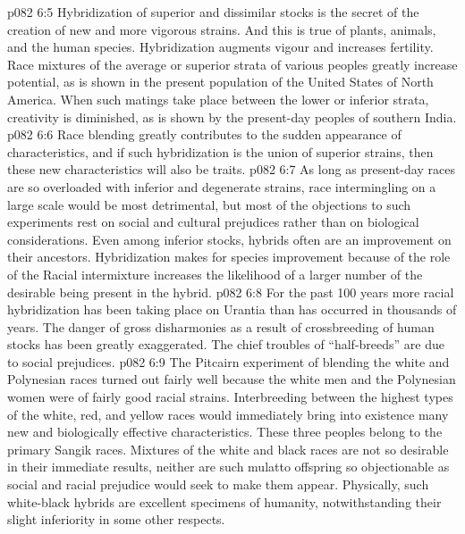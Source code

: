 \vs p082 6:5 Hybridization of superior and dissimilar stocks is the secret of the creation of new and more vigorous strains. And this is true of plants, animals, and the human species. Hybridization augments vigour and increases fertility. Race mixtures of the average or superior strata of various peoples greatly increase  potential, as is shown in the present population of the United States of North America. When such matings take place between the lower or inferior strata, creativity is diminished, as is shown by the present\hyp{}day peoples of southern India.
\vs p082 6:6 Race blending greatly contributes to the sudden appearance of  characteristics, and if such hybridization is the union of superior strains, then these new characteristics will also be  traits.
\vs p082 6:7 As long as present\hyp{}day races are so overloaded with inferior and degenerate strains, race intermingling on a large scale would be most detrimental, but most of the objections to such experiments rest on social and cultural prejudices rather than on biological considerations. Even among inferior stocks, hybrids often are an improvement on their ancestors. Hybridization makes for species improvement because of the role of the  Racial intermixture increases the likelihood of a larger number of the desirable  being present in the hybrid.
\vs p082 6:8 \pc For the past 100 years more racial hybridization has been taking place on Urantia than has occurred in thousands of years. The danger of gross disharmonies as a result of crossbreeding of human stocks has been greatly exaggerated. The chief troubles of “half\hyp{}breeds” are due to social prejudices.
\vs p082 6:9 The Pitcairn experiment of blending the white and Polynesian races turned out fairly well because the white men and the Polynesian women were of fairly good racial strains. Interbreeding between the highest types of the white, red, and yellow races would immediately bring into existence many new and biologically effective characteristics. These three peoples belong to the primary Sangik races. Mixtures of the white and black races are not so desirable in their immediate results, neither are such mulatto offspring so objectionable as social and racial prejudice would seek to make them appear. Physically, such white\hyp{}black hybrids are excellent specimens of humanity, notwithstanding their slight inferiority in some other respects.
